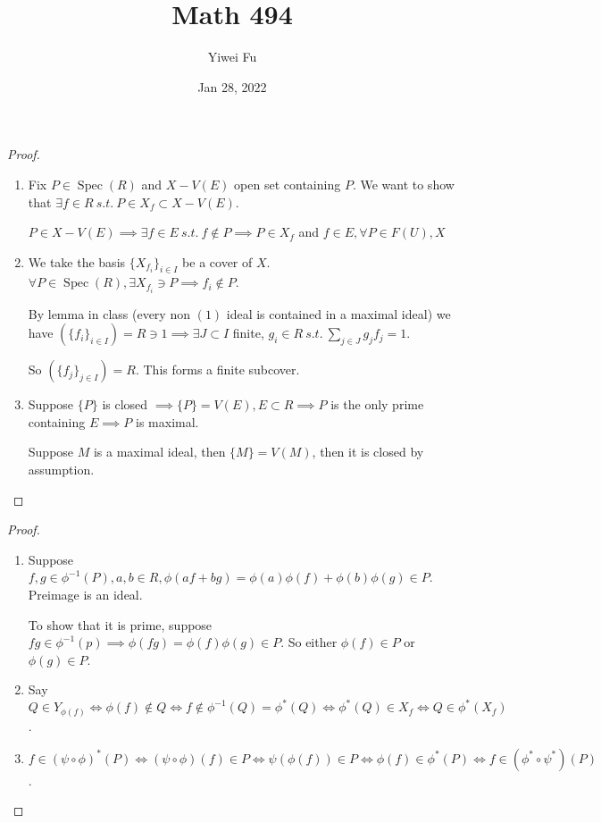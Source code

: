 \documentclass{article}
\newcommand{\st}{\ s.t.\ }
\def \Spec {\operatorname{Spec}}
\theoremstyle{definition}
\theoremstyle{remark}
\begin{document}
\title{Math 494}
\author{Yiwei Fu}
\date{Jan 28, 2022}
\maketitle

\begin{proof}
    \begin{enumerate}
        \item Fix $P \in \Spec(R)$ and $X - V(E)$ open set containing $P$. We want to show that $\exists f \in R \st P \in X_f \subset X - V(E)$.

        $P \in X - V(E) \implies \exists f \in E \st f \notin P \implies P \in X_f$ and $f \in E,  \forall P \in F(U), X$

        \item We take the basis $\{X_{f_i}\}_{i \in I}$ be a cover of $X$. $\forall P \in \Spec(R), \exists X_{f_i} \ni P \implies f_i \notin P$.

        By lemma in class (every non $(1)$ ideal is contained in a maximal ideal) we have $(\{f_i\}_{i \in I}) = R \ni 1 \implies \exists J \subset I$ finite, $g_i \in R \st \sum_{j \in J} g_jf_j = 1$.
        
        So $(\{f_j\}_{j \in I}) = R$. This forms a finite subcover.

        \item Suppose $\{P\}$ is closed $\implies \{P\} = V(E), E \subset R \implies P$ is the only prime containing $E \implies P$ is maximal.
        
        Suppose $M$ is a maximal ideal, then $\{M\} = V(M)$, then it is closed by assumption. \qedhere 
    \end{enumerate}

\end{proof}

\begin{proof}
    \begin{enumerate}
        \item Suppose $f, g \in \phi^{-1}(P), a, b \in R, \phi(af + bg) = \phi(a)\phi(f) + \phi(b)\phi(g) \in P$. Preimage is an ideal.
        
        To show that it is prime, suppose $fg \in \phi^{-1}(p) \implies \phi(fg) = \phi(f)\phi(g) \in P$. So either $\phi(f) \in P$ or $\phi(g) \in P$.

        \item Say $Q \in Y_{\phi(f)} \iff \phi(f) \notin Q \iff f \notin \phi^{-1}(Q) = \phi^*(Q) \iff \phi^*(Q) \in X_f \iff Q \in \phi^*(X_f)$.
        
        \item $f \in (\psi \circ \phi)^*(P) \iff (\psi \circ \phi)(f) \in P \iff \psi(\phi(f)) \in P \iff \phi(f) \in \phi^*(P) \iff f \in (\phi^* \circ \psi^*)(P)$. \qedhere
    \end{enumerate}
\end{proof}
\end{document}
